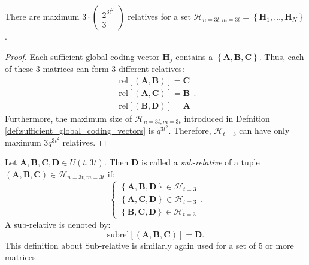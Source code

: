 \begin{lem}
There are maximum $3\cdot\left(\begin{array}{c}
2^{3t^{2}}\\
3
\end{array}\right)$ relatives for a set $\mathcal{H}_{n=3t,m=3t}=\left\{ \boldsymbol{H}_{1},\ldots,\boldsymbol{H}_{N}\right\} $.
\label{lem:num_of_relatives}
\end{lem}
\begin{proof}
Each sufficient global coding vector $\boldsymbol{H}_{j}$ contains
a $\left\{ \boldsymbol{A},\boldsymbol{B},\boldsymbol{C}\right\} $.
Thus, each of these 3 matrices can form 3 different relatives:
\[
\begin{array}{c}
\mathrm{rel}\left[\left(\boldsymbol{A},\boldsymbol{B}\right)\right]=\boldsymbol{C}\\
\mathrm{rel}\left[\left(\boldsymbol{A},\boldsymbol{C}\right)\right]=\boldsymbol{B}\\
\mathrm{rel}\left[\left(\boldsymbol{B},\boldsymbol{D}\right)\right]=\boldsymbol{A}
\end{array}.
\]
Furthermore, the maximum size of $\mathcal{H}_{n=3t,m=3t}$ introduced
in Defnition \ref{def:sufficient_global_coding_vectors} is $q^{3t^{2}}$.
Therefore, $\mathcal{H}_{t=3}$ can have only maximum $3q^{3t^{2}}$
relatives.
\end{proof}
\begin{defn}
 Let $\boldsymbol{A},\boldsymbol{B},\boldsymbol{C},\boldsymbol{D}\in U(t,3t)$.
Then $\boldsymbol{D}$ is called a \textit{sub-relative} of a tuple
$\left(\boldsymbol{A},\boldsymbol{B},\boldsymbol{C}\right)\in\mathcal{H}_{n=3t,m=3t}$
if:
\[
\left\{ \begin{array}{c}
\left\{ \boldsymbol{A},\boldsymbol{B},\boldsymbol{D}\right\} \in\mathcal{H}_{t=3}\\
\left\{ \boldsymbol{A},\boldsymbol{C},\boldsymbol{D}\right\} \in\mathcal{H}_{t=3}\\
\left\{ \boldsymbol{B},\boldsymbol{C},\boldsymbol{D}\right\} \in\mathcal{H}_{t=3}
\end{array}\right..
\]
A sub-relative is denoted by: 
\[
\mathrm{subrel}\left[\left(\boldsymbol{A},\boldsymbol{B},\boldsymbol{C}\right)\right]=\boldsymbol{D}.
\]
This definition about Sub-relative is similarly again used for a set
of 5 or more matrices.
\end{defn}
